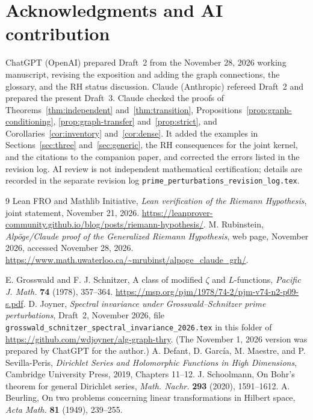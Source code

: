 \documentclass[12pt,letterpaper]{article}
\numberwithin{equation}{section}
\theoremstyle{remark}
\begin{document}
\section*{Acknowledgments and AI contribution}
ChatGPT (OpenAI) prepared Draft~2 from the November 28, 2026 working
manuscript, revising the exposition and adding the graph connections,
the glossary, and the RH status discussion.  Claude
(Anthropic) refereed Draft~2 and prepared the present Draft~3.  Claude
checked the proofs of Theorems~\ref{thm:independent}
and~\ref{thm:transition}, Propositions~\ref{prop:graph-conditioning},
\ref{prop:graph-transfer} and~\ref{prop:strict}, and
Corollaries~\ref{cor:inventory} and~\ref{cor:dense}.  It added the
examples in Sections~\ref{sec:three} and~\ref{sec:generic}, the RH
consequences for the joint kernel, and the citations to the companion
paper, and corrected the errors listed in the revision log.  AI review
is not independent mathematical certification; details are recorded in
the separate revision log \texttt{prime\_perturbations\_revision\_log.tex}.

\begin{thebibliography}{9} Lean FRO and Mathlib Initiative,
\emph{Lean verification of the Riemann Hypothesis},
joint statement, November 21, 2026.
\url{https://leanprover-community.github.io/blog/posts/riemann-hypothesis/}.
 M. Rubinstein,
\emph{Alp\"oge/Claude proof of the Generalized Riemann Hypothesis},
web page, November 2026, accessed November 28, 2026.
\url{https://www.math.uwaterloo.ca/~mrubinst/alpoge_claude_grh/}.

 E. Grosswald and F. J. Schnitzer, A class of modified $\zeta$ and $L$-functions, \emph{Pacific J. Math.} \textbf{74} (1978), 357--364. \url{https://msp.org/pjm/1978/74-2/pjm-v74-n2-p09-s.pdf}.
 D. Joyner, \emph{Spectral invariance under Grosswald--Schnitzer prime perturbations}, Draft~2, November 2026, file \texttt{grosswald\_schnitzer\_spectral\_invariance\_2026.tex} in this folder of \url{https://github.com/wdjoyner/alg-graph-thry}. (The November 1, 2026 version was prepared by ChatGPT for the author.)
 A. Defant, D. Garc\'ia, M. Maestre, and P. Sevilla-Peris, \emph{Dirichlet Series and Holomorphic Functions in High Dimensions}, Cambridge University Press, 2019, Chapters 11--12.
 J. Schoolmann, On Bohr's theorem for general Dirichlet series, \emph{Math. Nachr.} \textbf{293} (2020), 1591--1612.
 A. Beurling, On two problems concerning linear transformations in Hilbert space, \emph{Acta Math.} \textbf{81} (1949), 239--255.
\end{thebibliography}
\end{document}

